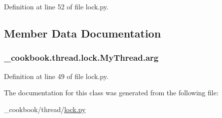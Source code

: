 Definition at line 52 of file lock.\-py.



\subsection{Member Data Documentation}
\hypertarget{class__cookbook_1_1thread_1_1lock_1_1MyThread_a91f0432528c15cb2a108aa527672709a}{
\subsubsection[{arg}]{\setlength{\rightskip}{0pt plus 5cm}\-\_\-cookbook.\-thread.\-lock.\-My\-Thread.\-arg}}\label{class__cookbook_1_1thread_1_1lock_1_1MyThread_a91f0432528c15cb2a108aa527672709a}


Definition at line 49 of file lock.\-py.



The documentation for this class was generated from the following file\-:\begin{DoxyCompactItemize}
\item 
\-\_\-cookbook/thread/\hyperlink{lock_8py}{lock.\-py}\end{DoxyCompactItemize}
